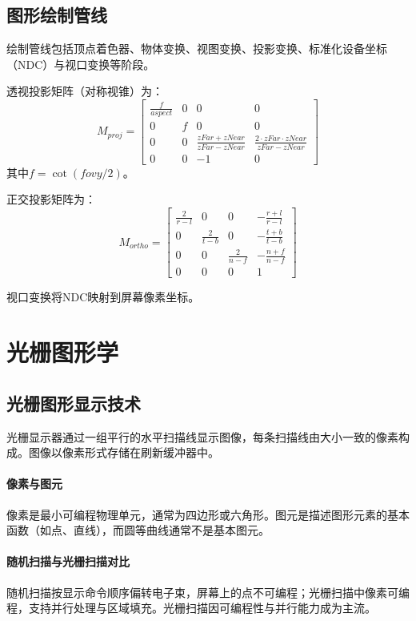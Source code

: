 \documentclass[12pt]{article}
\begin{document}
\subsection{图形绘制管线}

绘制管线包括顶点着色器、物体变换、视图变换、投影变换、标准化设备坐标（NDC）与视口变换等阶段。

透视投影矩阵（对称视锥）为：
\[
M_{proj} = \begin{bmatrix}
\frac{f}{aspect} & 0 & 0 & 0 \\
0 & f & 0 & 0 \\
0 & 0 & \frac{zFar + zNear}{zFar - zNear} & \frac{2 \cdot zFar \cdot zNear}{zFar - zNear} \\
0 & 0 & -1 & 0
\end{bmatrix}
\]
其中$f = \cot(fovy/2)$。

正交投影矩阵为：
\[
M_{ortho} = \begin{bmatrix}
\frac{2}{r-l} & 0 & 0 & -\frac{r+l}{r-l} \\
0 & \frac{2}{t-b} & 0 & -\frac{t+b}{t-b} \\
0 & 0 & \frac{2}{n-f} & -\frac{n+f}{n-f} \\
0 & 0 & 0 & 1
\end{bmatrix}
\]

视口变换将NDC映射到屏幕像素坐标。

\newpage

\section{光栅图形学}

\subsection{光栅图形显示技术}

光栅显示器通过一组平行的水平扫描线显示图像，每条扫描线由大小一致的像素构成。图像以像素形式存储在刷新缓冲器中。

\paragraph{像素与图元}
像素是最小可编程物理单元，通常为四边形或六角形。图元是描述图形元素的基本函数（如点、直线），而圆等曲线通常不是基本图元。

\paragraph{随机扫描与光栅扫描对比}
随机扫描按显示命令顺序偏转电子束，屏幕上的点不可编程；光栅扫描中像素可编程，支持并行处理与区域填充。光栅扫描因可编程性与并行能力成为主流。
\end{document}
